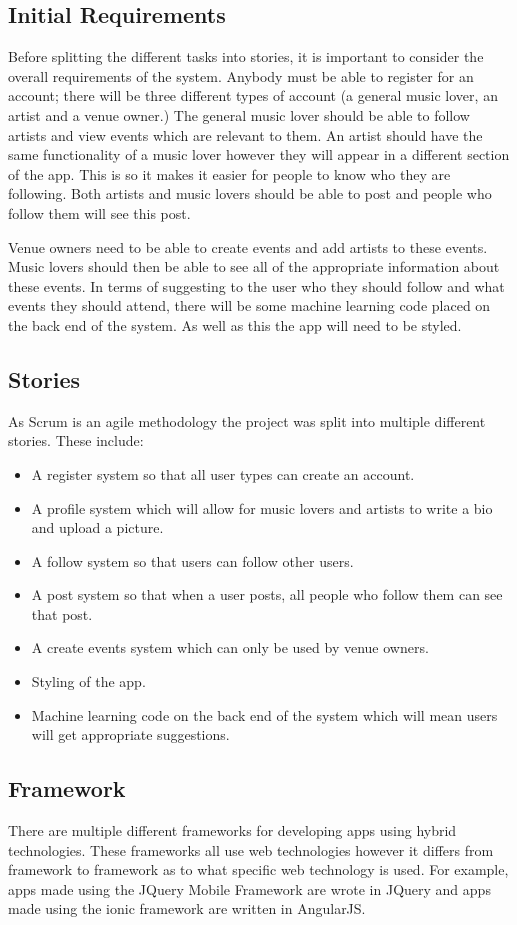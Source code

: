\subsection{Initial Requirements}
Before splitting the different tasks into stories, it is important to consider the overall requirements of the system. Anybody must be able to register for an account; there will be three different types of account (a general music lover, an artist and a venue owner.) The general music lover should be able to follow artists and view events which are relevant to them. An artist should have the same functionality of a music lover however they will appear in a different section of the app. This is so it makes it easier for people to know who they are following. Both artists and music lovers should be able to post and people who follow them will see this post.

Venue owners need to be able to create events and add artists to these events. Music lovers should then be able to see all of the appropriate information about these events. In terms of suggesting to the user who they should follow and what events they should attend, there will be some machine learning code placed on the back end of the system. As well as this the app will need to be styled.

\subsection{Stories}
As Scrum is an agile methodology the project was split into multiple different stories. These include:
\begin{itemize}
	\item A register system so that all user types can create an account.
	\item A profile system which will allow for music lovers and artists to write a bio and upload a picture.
	\item A follow system so that users can follow other users.
	\item A post system so that when a user posts, all people who follow them can see that post.
	\item A create events system which can only be used by venue owners.
	\item Styling of the app.
	\item Machine learning code on the back end of the system which will mean users will get appropriate suggestions.
\end{itemize}

\subsection{Framework}
There are multiple different frameworks for developing apps using hybrid technologies. These frameworks all use web technologies however it differs from framework to framework as to what specific web technology is used. For example, apps made using the JQuery Mobile Framework are wrote in JQuery and apps made using the ionic framework are written in AngularJS.

